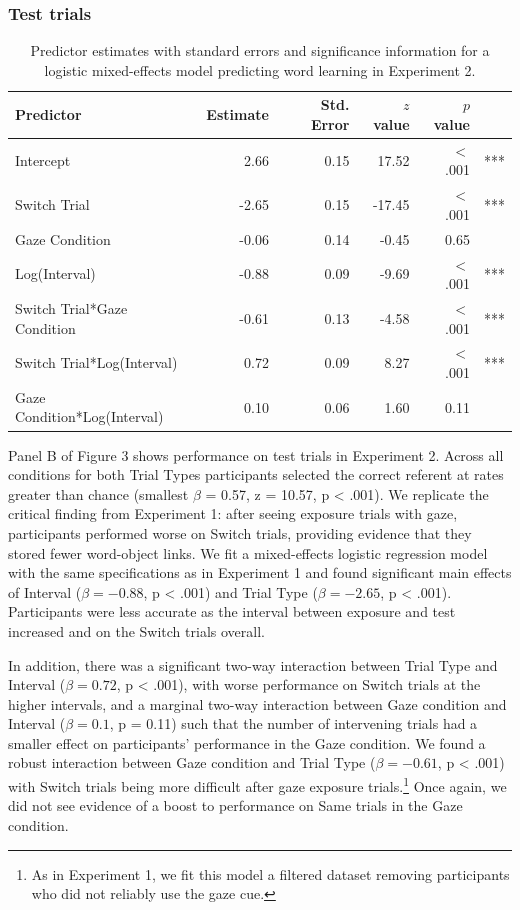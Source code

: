 \documentclass[authoryear, review]{elsarticle}
\begin{document}
\subsubsection{Test trials}\label{test-trials-1}

\begin{table}[tb]
\centering
\begin{tabular}{lrrrrl}
 Predictor & Estimate & Std. Error & $z$ value & $p$ value &  \\ 
  \hline
Intercept & 2.66 & 0.15 & 17.52 & $<$ .001 & *** \\ 
  Switch Trial & -2.65 & 0.15 & -17.45 & $<$ .001 & *** \\ 
  Gaze Condition & -0.06 & 0.14 & -0.45 & 0.65 &  \\ 
  Log(Interval) & -0.88 & 0.09 & -9.69 & $<$ .001 & *** \\ 
  Switch Trial*Gaze Condition & -0.61 & 0.13 & -4.58 & $<$ .001 & *** \\ 
  Switch Trial*Log(Interval) & 0.72 & 0.09 & 8.27 & $<$ .001 & *** \\ 
  Gaze Condition*Log(Interval) & 0.10 & 0.06 & 1.60 & 0.11 &  \\ 
   \hline
\end{tabular}
\caption{Predictor estimates with standard errors and significance information for a logistic mixed-effects model predicting word learning in Experiment 2.} 
\label{tab:exp2_reg}
\end{table}

Panel B of Figure 3 shows performance on test trials in Experiment 2.
Across all conditions for both Trial Types participants selected the
correct referent at rates greater than chance (smallest \(\beta\) =
0.57, z = 10.57, p \textless{} .001). We replicate the critical finding
from Experiment 1: after seeing exposure trials with gaze, participants
performed worse on Switch trials, providing evidence that they stored
fewer word-object links. We fit a mixed-effects logistic regression
model with the same specifications as in Experiment 1 and found
significant main effects of Interval (\(\beta = -0.88\), p \textless{}
.001) and Trial Type (\(\beta = -2.65\), p \textless{} .001).
Participants were less accurate as the interval between exposure and
test increased and on the Switch trials overall.

In addition, there was a significant two-way interaction between Trial
Type and Interval (\(\beta = 0.72\), p \textless{} .001), with worse
performance on Switch trials at the higher intervals, and a marginal
two-way interaction between Gaze condition and Interval
(\(\beta = 0.1\), p = 0.11) such that the number of intervening trials
had a smaller effect on participants' performance in the Gaze condition.
We found a robust interaction between Gaze condition and Trial Type
(\(\beta = -0.61\), p \textless{} .001) with Switch trials being more
difficult after gaze exposure
trials.\footnote{As in Experiment 1, we fit this model a filtered dataset removing participants who did not reliably use the gaze cue.}
Once again, we did not see evidence of a boost to performance on Same
trials in the Gaze condition.
\end{document}
